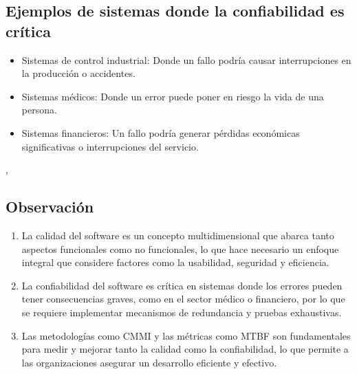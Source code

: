 \documentclass[12pt]{article}
\begin{document}
\subsection*{Ejemplos de sistemas donde la confiabilidad es crítica}
\begin{itemize}
    \item Sistemas de control industrial: Donde un fallo podría causar interrupciones en la producción o accidentes.
    \item Sistemas médicos: Donde un error puede poner en riesgo la vida de una persona.
    \item Sistemas financieros: Un fallo podría generar pérdidas económicas significativas o interrupciones del servicio.
\end{itemize}
\cite{quindioConfiabilidadSoftware}, \cite{sgConfiabilidadSoftware}


\subsection*{Observación}
\begin{enumerate}
    \item La calidad del software es un concepto multidimensional que abarca tanto aspectos funcionales como no funcionales, lo que hace necesario un enfoque integral que considere factores como la usabilidad, seguridad y eficiencia. 
    \item  La confiabilidad del software es crítica en sistemas donde los errores pueden tener consecuencias graves, como en el sector médico o financiero, por lo que se requiere implementar mecanismos de redundancia y pruebas exhaustivas.
    \item Las metodologías como CMMI y las métricas como MTBF son fundamentales para medir y mejorar tanto la calidad como la confiabilidad, lo que permite a las organizaciones asegurar un desarrollo eficiente y efectivo.
\end{enumerate}
\end{document}
